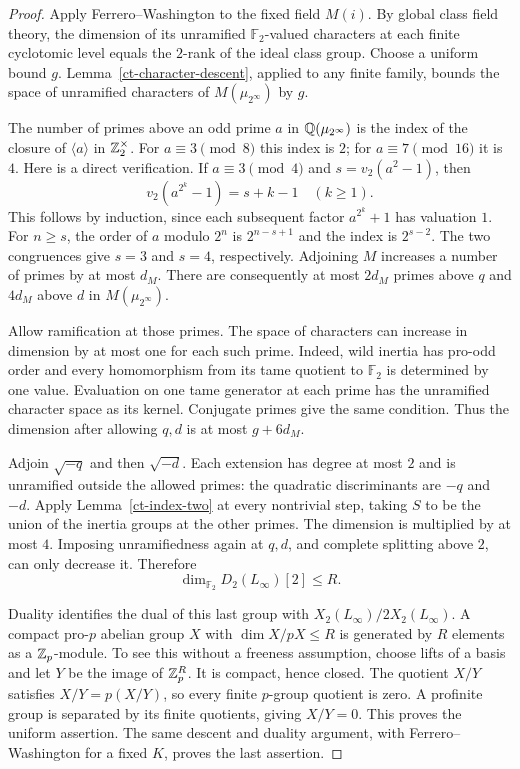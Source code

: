\begin{proof}
Apply Ferrero--Washington to the fixed field $M(i)$. By global
class field theory, the dimension of its unramified
$\mathbb F_2$-valued characters at each finite cyclotomic level
equals the $2$-rank of the ideal class group. Choose a uniform
bound $g$. Lemma~\ref{ct-character-descent}, applied to any finite
family, bounds the space of unramified characters of
$M(\mu_{2^\infty})$ by $g$.

The number of primes above an odd prime $a$ in
$\mathbb Q(\mu_{2^\infty})$ is the index of the closure of $\langle a\rangle$
in $\mathbb Z_2^\times$. For $a\equiv3\pmod8$ this index is $2$;
for $a\equiv7\pmod {16}$ it is $4$. Here is a direct verification.
If $a\equiv3\pmod4$ and $s=v_2(a^2-1)$, then
\[
 v_2(a^{2^k}-1)=s+k-1\quad(k\ge1).
\]
This follows by induction, since each subsequent factor
$a^{2^k}+1$ has valuation $1$. For $n\ge s$, the order of $a$
modulo $2^n$ is $2^{n-s+1}$ and the index is $2^{s-2}$.
The two congruences give $s=3$ and $s=4$, respectively.
Adjoining $M$ increases a number of primes by at most $d_M$.
There are consequently at most $2d_M$ primes above $q$ and
$4d_M$ above $d$ in $M(\mu_{2^\infty})$.

Allow ramification at those primes. The space of characters can
increase in dimension by at most one for each such prime. Indeed,
wild inertia has pro-odd order and every homomorphism from its
tame quotient to $\mathbb F_2$ is determined by one value.
Evaluation on one tame generator at each prime has the unramified
character space as its kernel. Conjugate primes give the same
condition. Thus the dimension after allowing $q,d$ is at most
$g+6d_M$.

Adjoin $\sqrt{-q}$ and then $\sqrt{-d}$. Each extension has
degree at most $2$ and is unramified outside the allowed primes:
the quadratic discriminants are $-q$ and $-d$.
Apply Lemma~\ref{ct-index-two} at every nontrivial step, taking
$S$ to be the union of the inertia groups at the other primes.
The dimension is multiplied by at most $4$. Imposing
unramifiedness again at $q,d$, and complete splitting above $2$,
can only decrease it. Therefore
\[
             \dim_{\mathbb F_2}D_2(L_\infty)[2]\le R.
\]

Duality identifies the dual of this last group with
$X_2(L_\infty)/2X_2(L_\infty)$. A compact pro-$p$ abelian group
$X$ with $\dim X/pX\le R$ is generated by $R$ elements as a
$\mathbb Z_p$-module. To see this without a freeness assumption, choose
lifts of a basis and let $Y$ be the image of $\mathbb Z_p^R$.
It is compact, hence closed. The quotient $X/Y$ satisfies
$X/Y=p(X/Y)$, so every finite $p$-group quotient is zero.
A profinite group is separated by its finite quotients, giving
$X/Y=0$. This proves the uniform assertion. The same descent
and duality argument, with Ferrero--Washington for a fixed $K$,
proves the last assertion.
\end{proof}

